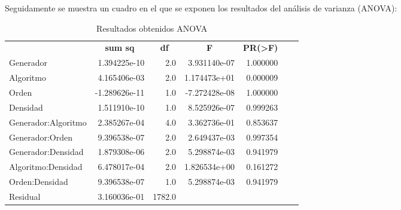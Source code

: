 \documentclass[10pt,a4paper]{article}
\begin{document}
Seguidamente se muestra un cuadro en el que se exponen los resultados del análisis de varianza (ANOVA):

\begin{table}[H]
\begin{center}
\begin{tabular}{lllllll}
\multicolumn{1}{c}{} & \multicolumn{1}{c}{\textbf{sum sq}}       & \multicolumn{1}{c}{\textbf{df}}     & \multicolumn{1}{c}{\textbf{F}}             & \multicolumn{1}{c}{\textbf{PR(\textgreater{}F)}} &  &  \\
Generador            & \multicolumn{1}{r}{1.394225e-10}  & \multicolumn{1}{r}{2.0}    & \multicolumn{1}{r}{3.931140e-07}  & \multicolumn{1}{r}{1.000000}            &  &  \\
Algoritmo            & \multicolumn{1}{r}{4.165406e-03}  & \multicolumn{1}{r}{2.0}    & \multicolumn{1}{r}{1.174473e+01}  & \multicolumn{1}{r}{0.000009}            &  &  \\
Orden                & \multicolumn{1}{r}{-1.289626e-11} & \multicolumn{1}{r}{1.0}    & \multicolumn{1}{r}{-7.272428e-08} & \multicolumn{1}{r}{1.000000}            &  &  \\
Densidad             & \multicolumn{1}{r}{1.511910e-10}  & \multicolumn{1}{r}{1.0}    & \multicolumn{1}{r}{8.525926e-07}  & \multicolumn{1}{r}{0.999263}            &  &  \\
Generador:Algoritmo  & \multicolumn{1}{r}{2.385267e-04}  & \multicolumn{1}{r}{4.0}    & \multicolumn{1}{r}{3.362736e-01}  & \multicolumn{1}{r}{0.853637}            &  &  \\
Generador:Orden      & \multicolumn{1}{r}{9.396538e-07}  & \multicolumn{1}{r}{2.0}    & \multicolumn{1}{r}{2.649437e-03}  & \multicolumn{1}{r}{0.997354}            &  &  \\
Generador:Densidad   & \multicolumn{1}{r}{1.879308e-06}  & \multicolumn{1}{r}{2.0}    & \multicolumn{1}{r}{5.298874e-03}  & \multicolumn{1}{r}{0.941979}            &  &  \\
Algoritmo:Densidad   & \multicolumn{1}{r}{6.478017e-04}  & \multicolumn{1}{r}{2.0}    & \multicolumn{1}{r}{1.826534e+00}  & \multicolumn{1}{r}{0.161272}            &  &  \\
Orden:Densidad       & \multicolumn{1}{r}{9.396538e-07}  & \multicolumn{1}{r}{1.0}    & \multicolumn{1}{r}{5.298874e-03}  & \multicolumn{1}{r}{0.941979}            &  &  \\
Residual             & \multicolumn{1}{r}{3.160036e-01}  & \multicolumn{1}{r}{1782.0} & \multicolumn{1}{r}{}              & \multicolumn{1}{r}{}                    &  &  \\                   
\end{tabular}
\end{center}
\caption{Resultados obtenidos ANOVA}
\end{table}
\end{document}
